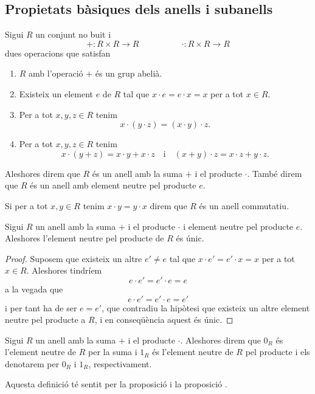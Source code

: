 \documentclass[../Apunts.tex]{subfiles}
\begin{document}
	\subsection{Propietats bàsiques dels anells i subanells}
	\begin{definition}[Anell]
		\label{def:anell}
		\label{def:anell commutatiu}
		\label{def:anell i element neutre pel producte}
		Sigui \(R\) un conjunt no buit i
		\[+\colon R\times R\longrightarrow R\qquad\qquad\quad\cdot\colon R\times R\longrightarrow R\]
		dues operacions que satisfan
		\begin{enumerate}
			\item \(R\) amb l'operació \(+\) és un grup abelià.
			\item Existeix un element \(e\) de \(R\) tal que \(x\cdot e=e\cdot x=x\) per a tot \(x\in R\).
			\item Per a tot \(x,y,z\in R\) tenim
			\[x\cdot(y\cdot z)=(x\cdot y)\cdot z.\]
			\item Per a tot \(x,y,z\in R\) tenim
			\[x\cdot(y+z)=x\cdot y+x\cdot z\quad\text{i}\quad(x+y)\cdot z=x\cdot z+y\cdot z.\]
		\end{enumerate}
		Aleshores direm que \(R\) és un anell amb la suma \(+\) i el producte \(\cdot\). També direm que \(R\) és un anell amb element neutre pel producte \(e\).
		
		Si per a tot \(x,y\in R\) tenim \(x\cdot y=y\cdot x\) direm que \(R\) és un anell commutatiu.
	\end{definition}
	\begin{proposition}
		\label{prop:unicitat neutre del producte anell}
		Sigui \(R\) un anell amb la suma \(+\) i el producte \(\cdot\) i element neutre pel producte \(e\). Aleshores l'element neutre pel producte de \(R\) és únic.
		\begin{proof}
			Suposem que existeix un altre \(e'\neq e\) tal que \(x\cdot e'=e'\cdot x=x\) per a tot \(x\in R\). Aleshores tindríem
			\[e\cdot e'=e'\cdot e=e\]
			a la vegada que
			\[e\cdot e'=e'\cdot e=e'\]
			i per tant ha de ser \(e=e'\), que contradiu la hipòtesi que existeix un altre element neutre pel producte a \(R\), i en conseqüència aquest és únic.
		\end{proof}
	\end{proposition}
	\begin{definition}
		\label{def:l'element neutre d'un anell per la suma}
		\label{def:l'element neutre d'un anell pel producte}
		Sigui \(R\) un anell amb la suma \(+\) i el producte \(\cdot\). Aleshores direm que \(0_{R}\) és l'element neutre de \(R\) per la suma i \(1_{R}\) és l'element neutre de \(R\) pel producte i els denotarem per \(0_{R}\) i \(1_{R}\), respectivament.
		
		Aquesta definició té sentit per la proposició  i la proposició .
	\end{definition}
\end{document}
